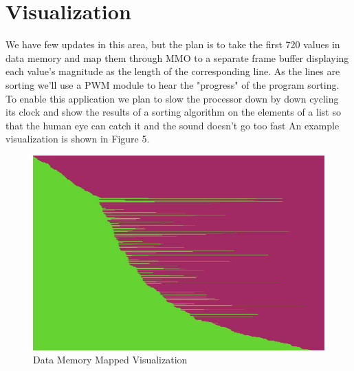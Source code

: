 \documentclass[conference]{IEEEtran}
\begin{document}
\section{Visualization}
We have few updates in this area, but the plan is to take the first 720 values in data memory and map them through MMO to a separate frame buffer displaying each value's magnitude as the length of the corresponding line. As the lines are sorting we'll use a PWM module to hear the "progress" of the program sorting. To enable this application we plan to slow the processor down by down cycling its clock and show the results of a sorting algorithm on the elements of a list so that the human eye can catch it and the sound doesn't go too fast
An example visualization is shown in Figure 5. 
\begin{figure}
    \centering
    \includegraphics[width=1\linewidth]{MMO.png}
    \caption{Data Memory Mapped Visualization}
    \label{fig:enter-label}
\end{figure}
\end{document}
